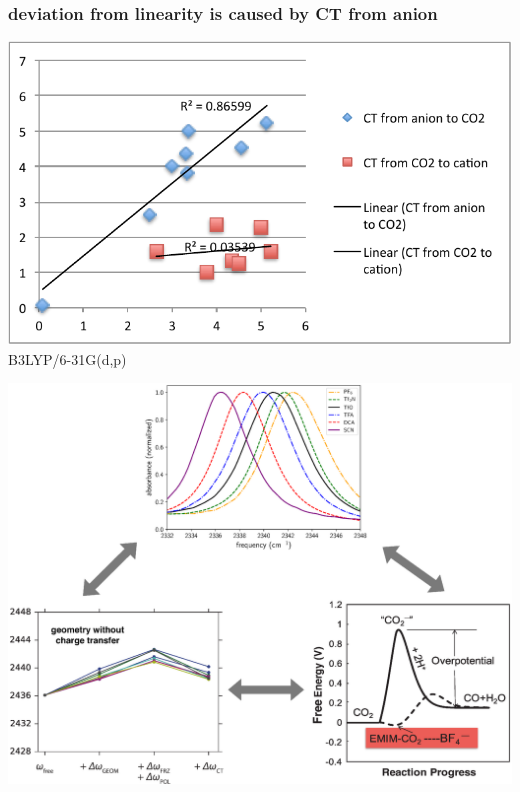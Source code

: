 \documentclass[xcolor=usenames,dvipsnames,svgnames]{beamer}
\begin{document}
\begin{frame}
  \frametitle{ deviation from linearity is caused by CT from anion}
  \centering
  \includegraphics[width=\linewidth,keepaspectratio]{./figures/angle_vs_ct_to_from.pdf}
  \scriptsize
  B3LYP/6-31G(d,p)
\end{frame}

\begin{frame}
  \includegraphics[width=0.90\linewidth,keepaspectratio]{./figures/application_of_ct.eps}
\end{frame}
\end{document}
